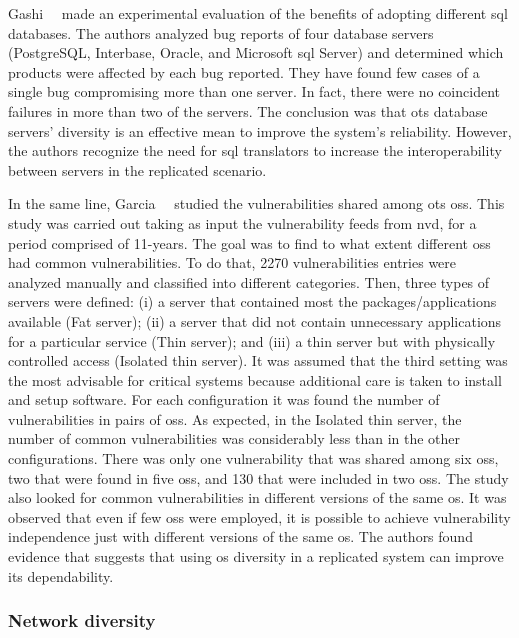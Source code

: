 Gashi~\etal{}~\cite{Gashi:2007} made an experimental evaluation of the benefits of adopting different \gls{sql} databases.
The authors analyzed bug reports of four database servers (PostgreSQL, Interbase, Oracle, and Microsoft \gls{sql} Server) and determined which products were affected by each bug reported. 
They have found few cases of a single bug compromising more than one server. 
In fact, there were no coincident failures in more than two of the servers.
The conclusion was that \gls{ots} database servers’ diversity is an effective mean to improve the system's reliability. 
However, the authors recognize the need for \gls{sql} translators to increase the interoperability between servers in the replicated scenario.

In the same line, Garcia~\etal{}~\cite{Garcia:2012} studied the vulnerabilities shared among \gls{ots} \glspl{os}.
This study was carried out taking as input the vulnerability feeds from \gls{nvd}, for a period comprised of 11-years. 
The goal was to find to what extent different \glspl{os} had common vulnerabilities. 
To do that, 2270 vulnerabilities entries were analyzed manually and classified into different categories. 
Then, three types of servers were defined: (i) a server that contained most the packages/applications available (Fat server); (ii) a server that did not contain unnecessary applications for a particular service (Thin server); and (iii) a thin server but with physically controlled access (Isolated thin server). 
It was assumed that the third setting was the most advisable for critical systems because additional care is taken to install and setup software. 
For each configuration it was found the number of vulnerabilities in pairs of \glspl{os}. 
As expected, in the Isolated thin server, the number of common vulnerabilities was considerably less than in the other configurations. 
There was only one vulnerability that was shared among six \glspl{os}, two that were found in five \glspl{os}, and 130 that were included in two \glspl{os}. 
The study also looked for common vulnerabilities in different versions of the same \gls{os}. 
It was observed that even if few \glspl{os} were employed, it is possible to achieve vulnerability independence just with different versions of the same \gls{os}.
The authors found evidence that suggests that using \gls{os} diversity in a replicated system can improve its dependability. 



\subsubsection{Network diversity}

